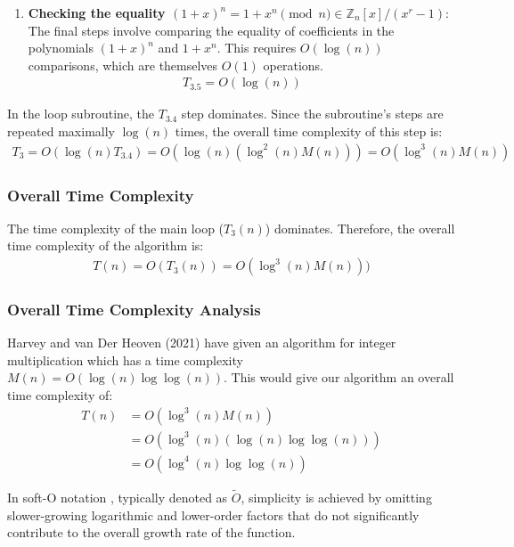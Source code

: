 \documentclass{article}
\theoremstyle{plain}
\theoremstyle{definition}
\newcommand{\Z}{\mathbb{Z}}
\newcommand{\D}{r}
\begin{document}
\begin{enumerate}[label*=\arabic*.]
\begin{enumerate}[label*=\arabic*.]
        \item \textbf{Checking the equality $(1+x)^n = 1 + x^n \pmod{n} \in \Z_n[x]/(x^{\D}-1)$}:
        The final steps involve comparing the equality of coefficients in the polynomials $(1+x)^n$ and $1 + x^n$. This requires $O(\log(n))$ comparisons, which are themselves $O(1)$ operations.
        \begin{align}
            T_{3.5} = O(\log(n))
        \end{align}
        
    \end{enumerate}
    In the loop subroutine, the $T_{3.4}$ step dominates. Since the subroutine's steps are repeated maximally $\log(n)$ times, the overall time complexity of this step is:
    \begin{align}
        T_{3} = O(\log(n) T_{3.4}) = O(\log(n) (\log^2(n) M(n))) = O(\log^3(n) M(n))
    \end{align}
    
\end{enumerate}

\subsubsection{Overall Time Complexity}
The time complexity of the main loop ($T_3(n)$) dominates. Therefore, the overall time complexity of the algorithm is:
\begin{align}
    T(n) = O(T_3(n)) = O(\log^3(n) M(n)))
\end{align}

\subsubsection{Overall Time Complexity Analysis}
Harvey and van Der Heoven (2021) \cite{harveyvanderhoeven2021} have given an algorithm for integer multiplication which has a time complexity $M(n) = O(\log(n) \log\log(n))$. This would give our algorithm an overall time complexity of:
\begin{align}
    T(n) &= O(\log^3(n) M(n))
    \\ &= O(\log^3(n) (\log(n) \log\log(n)))
    \\ &= O(\log^4(n) \log\log(n))
\end{align}

In soft-O notation \cite{gathengerhard2013softo}, typically denoted as $\tilde{O}$, simplicity is achieved by omitting slower-growing logarithmic and lower-order factors that do not significantly contribute to the overall growth rate of the function.
\end{document}
